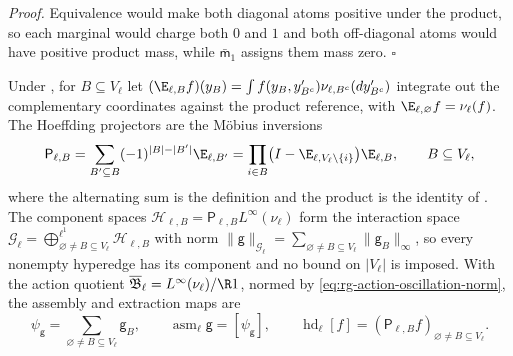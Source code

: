 \noindent\emph{Proof.}
Equivalence would make both diagonal atoms positive under the product, so each
marginal would charge both $0$ and $1$ and both off-diagonal atoms would have
positive product mass, while $\bar{\mathsf m}_1$ assigns them mass zero.
$\square$

Under , for $B\subseteq V_\ell$ let
$(\E_{\ell,B}f)(y_B)=\int f(y_B,y'_{B^c})\nu_{\ell,B^c}(dy'_{B^c})$ integrate
out the complementary coordinates against the product reference, with
$\E_{\ell,\varnothing}f=\nu_\ell(f)$. The Hoeffding projectors are the
M\"obius inversions
\begin{equation}
\mathsf P_{\ell,B}
=\sum_{B'\subseteq B}(-1)^{\lvert B\rvert-\lvert B'\rvert}\E_{\ell,B'}
=\prod_{i\in B}\bigl(I-\E_{\ell,V_\ell\setminus\{i\}}\bigr)\E_{\ell,B},
\qquad B\subseteq V_\ell,
\label{eq:rg-hoeffding-mobius-projectors}
\end{equation}
where the alternating sum is the definition and the product is the identity of
. The component spaces
$\mathcal H_{\ell,B}=\mathsf P_{\ell,B}L^\infty(\nu_\ell)$ form the interaction
space $\mathcal G_\ell=\bigoplus^{\ell^1}_{\varnothing\ne B\subseteq
V_\ell}\mathcal H_{\ell,B}$ with norm $\lVert\mathsf g\rVert_{\mathcal
G_\ell}=\sum_{\varnothing\ne B\subseteq V_\ell}\lVert\mathsf g_B\rVert_\infty$, so
every nonempty hyperedge has its component and no bound on $\lvert V_\ell\rvert$
is imposed. With the action quotient
$\overline{\mathfrak B}_\ell=L^\infty(\nu_\ell)/\R1$, normed by
\eqref{eq:rg-action-oscillation-norm}, the assembly and extraction maps are
\begin{equation}
\psi_{\mathsf g}=\sum_{\varnothing\ne B\subseteq V_\ell}\mathsf g_B,
\qquad
\operatorname{asm}_\ell\mathsf g=[\psi_{\mathsf g}],
\qquad
\operatorname{hd}_\ell[f]=(\mathsf P_{\ell,B}f)_{\varnothing\ne B\subseteq V_\ell}.
\label{eq:rg-interaction-assembly-extraction}
\end{equation}

